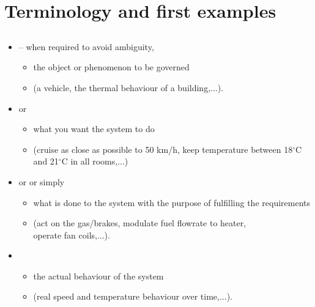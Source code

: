\section{Terminology and first examples}
\subsection{}

\begin{frame}
\myPause
 \begin{itemize}[<+-| alert@+>]
 \item {} -- when required to avoid ambiguity, 
       \begin{itemize}[<+-| alert@+>]
       \item[] the object or phenomenon to be governed
       \item[] (a vehicle, the thermal behaviour of a building,...).
       \end{itemize}
 \item {} or 
       \begin{itemize}[<+-| alert@+>]
       \item[] what you want the system to do\\
       \item[] (cruise as close as possible to 50 km/h, keep temperature between 18$^{\circ}$C\\
                and 21$^{\circ}$C in all rooms,...)
       \end{itemize}
 \item {} or  or simply 
       \begin{itemize}[<+-| alert@+>]
       \item[] what is done to the system with the purpose of fulfilling the requirements
       \item[] (act on the gas/brakes, modulate fuel flowrate to heater,\\
                operate fan coils,...).
       \end{itemize}
 \item {}
       \begin{itemize}[<+-| alert@+>]
       \item[] the actual behaviour of the system
       \item[] (real speed and temperature behaviour over time,...).
       \end{itemize}
 \end{itemize}
\end{frame}

